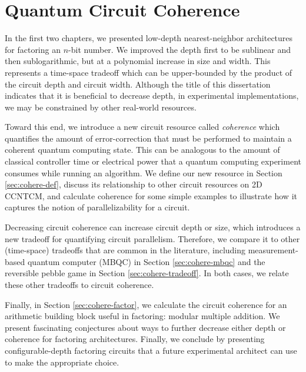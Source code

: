 \chapter{Quantum Circuit Coherence}
\label{chap:coherence}

In the first two chapters, we presented low-depth nearest-neighbor
architectures for factoring an $n$-bit number. We improved the depth first to
be sublinear and then sublogarithmic, but at a polynomial increase in size
and width. This represents a time-space tradeoff which can be upper-bounded
by the product of the circuit depth and circuit width. Although the title of
this dissertation indicates that it is beneficial to decrease depth, in
experimental implementations, we may be constrained by other real-world
resources.

Toward this end, we introduce a new circuit resource called \emph{coherence}
which quantifies the amount of error-correction that must be performed
to maintain a coherent quantum computing state. This can be analogous to
the amount of classical controller time or electrical power that a
quantum computing experiment consumes while running an algorithm. We
define our new resource in Section \ref{sec:cohere-def}, discuss its
relationship to other circuit resources on \textsf{2D CCNTCM}, and
calculate coherence for some simple examples to illustrate how it
captures the notion of parallelizability for a circuit.

Decreasing circuit coherence can increase circuit depth or size, which introduces
a new tradeoff for quantifying circuit parallelism.
Therefore, we compare it to other (time-space) tradeoffs that are common in
the literature, including measurement-based quantum computer (MBQC) in
Section \ref{sec:cohere-mbqc} and the reversible pebble game in
Section \ref{sec:cohere-tradeoff}. In both cases, we relate these
other tradeoffs to circuit coherence.

Finally, in Section \ref{sec:cohere-factor}, we calculate the circuit coherence
for an arithmetic building block useful in factoring: modular multiple addition.
We present fascinating conjectures about ways to further decrease
either depth or coherence for factoring architectures. Finally, we conclude
by presenting configurable-depth factoring circuits
that a future experimental architect can use to make the appropriate choice.










%

%